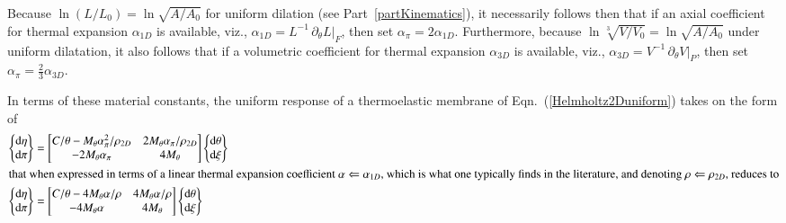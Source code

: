 Because $\ln (L/L_0) = \ln \sqrt{A / \! A_0}$ for uniform dilation (see Part~\ref{partKinematics}), it necessarily follows then that if an axial coefficient for thermal expansion $\alpha_{1D}$ is available, viz., $\alpha_{1D} = L^{-1} \, \partial_{\theta} L |_F$, then set $\alpha_{\pi} = 2 \alpha_{1D}$.  Furthermore, because $\ln \sqrt[3]{V \! / V_0} = \ln \sqrt{A / \! A_0}$ under uniform dilatation, it also follows that if a volumetric coefficient for thermal expansion $\alpha_{3D}$ is available, viz., $\alpha_{3D} = V^{-1} \, \partial_{\theta} V |_P$, then set $\alpha_{\pi} = \tfrac{2}{3} \alpha_{3D}$. 

In terms of these material constants, the uniform response of a thermo\-elastic membrane of Eqn.~(\ref{Helmholtz2Duniform}) takes on the form of 
\begin{subequations}
    \label{HelmholtzMembraneODEs}
    \begin{align}
    \left\{ \begin{matrix}
    \mathrm{d} \eta \\ \mathrm{d} \pi 
    \end{matrix} \right\} & = \begin{bmatrix}
    C / \theta - M_{\theta} \alpha_{\pi}^2 / \rho_{2D} & 
    2 M_{\theta} \alpha_{\pi} / \rho_{2D} \\
    -2 M_{\theta} \alpha_{\pi} & 4 M_{\theta}
    \end{bmatrix} \left\{ \begin{matrix}
    \mathrm{d} \theta \\ \mathrm{d} \xi 
    \end{matrix} \right\} \notag \\
    \intertext{that when expressed in terms of a linear thermal expansion coefficient $\alpha \Leftarrow \alpha_{1D}$, which is what one typically finds in the literature, and denoting $\rho \Leftarrow \rho_{2D}$, reduces to}
    \left\{ \begin{matrix}
    \mathrm{d} \eta \\ \mathrm{d} \pi
    \end{matrix} \right\} & = \begin{bmatrix}
    C / \theta - 4 M_{\theta} \alpha / \rho & 
    4 M_{\theta} \alpha / \rho \\
    -4 M_{\theta} \alpha & 4 M_{\theta}
    \end{bmatrix} \left\{ \begin{matrix}
    \mathrm{d} \theta \\ \mathrm{d} \xi
    \end{matrix} \right\}

\end{align}
\end{subequations}
